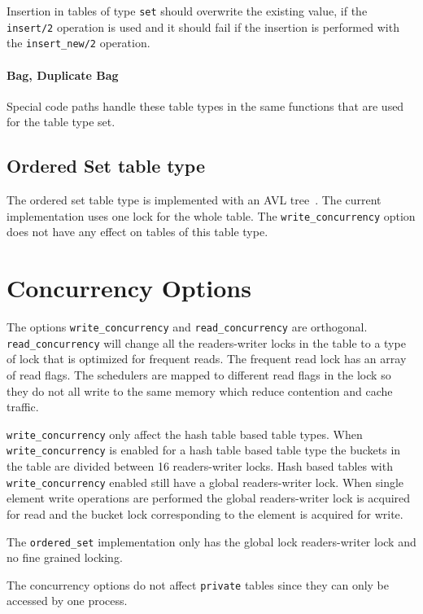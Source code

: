 \documentclass[aps,pre,preprint,nofootinbib]{revtex4}
\begin{document}
Insertion in tables of type \verb|set| should overwrite the existing value, if the \verb|insert/2| operation is used and it should fail if the insertion is performed with the \verb|insert_new/2| operation.

\paragraph{Bag, Duplicate Bag}

Special code paths handle these table types in the same functions that are used for the table type set.

\subsection{Ordered Set table type}

The ordered set table type is implemented with an AVL tree~\cite{adelson1962information}.
The current implementation uses one lock for the whole table.
The \verb|write_concurrency| option does not have any effect on tables of this table type.

\section{Concurrency Options} \label{sec:concurrency_options}

The options \verb|write_concurrency| and \verb|read_concurrency| are orthogonal.
\verb|read_concurrency| will change all the readers-writer locks in the table to a type of lock that is optimized for frequent reads.
The frequent read lock has an array of read flags.
The schedulers are mapped to different read flags in the lock so they do not all write to the same memory which reduce contention and cache traffic.

\verb|write_concurrency| only affect the hash table based table types.
When \verb|write_concurrency| is enabled for a hash table based table type the buckets in the table are divided between 16 readers-writer locks.
Hash based tables with \verb|write_concurrency| enabled still have a global readers-writer lock.
When single element write operations are performed the global readers-writer lock is acquired for read and the bucket lock corresponding to the element is acquired for write.

The \verb|ordered_set| implementation only has the global lock readers-writer lock and no fine grained locking.

The concurrency options do not affect \verb|private| tables since they can only be accessed by one process.
\end{document}
